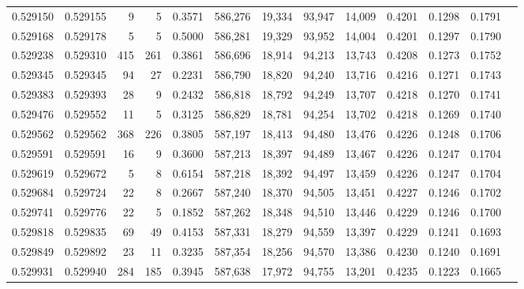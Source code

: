 \begin{tabular}{rrrrrrrrrrrrr}
0.529150 & 0.529155 &     9 &     5 &                                     0.3571 & 586,276 &  19,334 &  93,947 &  14,009 & 0.4201 & 0.1298 & 0.1791 \\
0.529168 & 0.529178 &     5 &     5 &                                     0.5000 & 586,281 &  19,329 &  93,952 &  14,004 & 0.4201 & 0.1297 & 0.1790 \\
0.529238 & 0.529310 &   415 &   261 &                                     0.3861 & 586,696 &  18,914 &  94,213 &  13,743 & 0.4208 & 0.1273 & 0.1752 \\
0.529345 & 0.529345 &    94 &    27 &                                     0.2231 & 586,790 &  18,820 &  94,240 &  13,716 & 0.4216 & 0.1271 & 0.1743 \\
0.529383 & 0.529393 &    28 &     9 &                                     0.2432 & 586,818 &  18,792 &  94,249 &  13,707 & 0.4218 & 0.1270 & 0.1741 \\
0.529476 & 0.529552 &    11 &     5 &                                     0.3125 & 586,829 &  18,781 &  94,254 &  13,702 & 0.4218 & 0.1269 & 0.1740 \\
0.529562 & 0.529562 &   368 &   226 &                                     0.3805 & 587,197 &  18,413 &  94,480 &  13,476 & 0.4226 & 0.1248 & 0.1706 \\
0.529591 & 0.529591 &    16 &     9 &                                     0.3600 & 587,213 &  18,397 &  94,489 &  13,467 & 0.4226 & 0.1247 & 0.1704 \\
0.529619 & 0.529672 &     5 &     8 &                                     0.6154 & 587,218 &  18,392 &  94,497 &  13,459 & 0.4226 & 0.1247 & 0.1704 \\
0.529684 & 0.529724 &    22 &     8 &                                     0.2667 & 587,240 &  18,370 &  94,505 &  13,451 & 0.4227 & 0.1246 & 0.1702 \\
0.529741 & 0.529776 &    22 &     5 &                                     0.1852 & 587,262 &  18,348 &  94,510 &  13,446 & 0.4229 & 0.1246 & 0.1700 \\
0.529818 & 0.529835 &    69 &    49 &                                     0.4153 & 587,331 &  18,279 &  94,559 &  13,397 & 0.4229 & 0.1241 & 0.1693 \\
0.529849 & 0.529892 &    23 &    11 &                                     0.3235 & 587,354 &  18,256 &  94,570 &  13,386 & 0.4230 & 0.1240 & 0.1691 \\
0.529931 & 0.529940 &   284 &   185 &                                     0.3945 & 587,638 &  17,972 &  94,755 &  13,201 & 0.4235 & 0.1223 & 0.1665 \\

\end{tabular}
